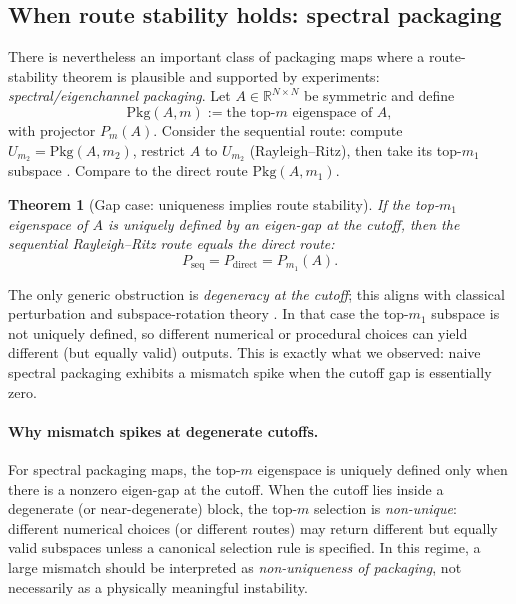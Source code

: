 \documentclass[11pt]{article}
\theoremstyle{plain}
\newtheorem{theorem}{Theorem}[section]
\theoremstyle{definition}
\theoremstyle{remark}
\newcommand{\R}{\mathbb{R}}
\begin{document}
\subsection{When route stability holds: spectral packaging}\label{subsec:spectral_route_stability}

There is nevertheless an important class of packaging maps where a route-stability theorem is plausible and supported by experiments:
\emph{spectral/eigenchannel packaging}.
Let \(A\in\R^{N\times N}\) be symmetric and define
\[
\mathrm{Pkg}(A,m) := \text{the top-}m\text{ eigenspace of }A,
\]
with projector \(P_m(A)\).
Consider the sequential route: compute \(U_{m_2}=\mathrm{Pkg}(A,m_2)\), restrict \(A\) to \(U_{m_2}\) (Rayleigh--Ritz), then take its top-\(m_1\) subspace \cite{golub_vanloan_2013}.
Compare to the direct route \(\mathrm{Pkg}(A,m_1)\).

\begin{theorem}[Gap case: uniqueness implies route stability]\label{thm:spectral_gap_route_stability}
If the top-\(m_1\) eigenspace of \(A\) is uniquely defined by an eigen-gap at the cutoff, then the sequential Rayleigh--Ritz route equals the direct route:
\[
P_{\mathrm{seq}} = P_{\mathrm{direct}} = P_{m_1}(A).
\]
\end{theorem}

The only generic obstruction is \emph{degeneracy at the cutoff}; this aligns with classical perturbation and subspace-rotation theory \cite{davis_kahan_1970,stewart_sun_1990}.
In that case the top-\(m_1\) subspace is not uniquely defined, so different numerical or procedural choices can yield different (but equally valid) outputs.
This is exactly what we observed: naive spectral packaging exhibits a mismatch spike when the cutoff gap is essentially zero.
\paragraph{Why mismatch spikes at degenerate cutoffs.}
For spectral packaging maps, the top-\(m\) eigenspace is uniquely defined only when there is a nonzero eigen-gap at the cutoff.
When the cutoff lies inside a degenerate (or near-degenerate) block, the top-\(m\) selection is \emph{non-unique}:
different numerical choices (or different routes) may return different but equally valid subspaces unless a canonical selection rule is specified.
In this regime, a large mismatch should be interpreted as \emph{non-uniqueness of packaging}, not necessarily as a physically meaningful instability.
\end{document}
